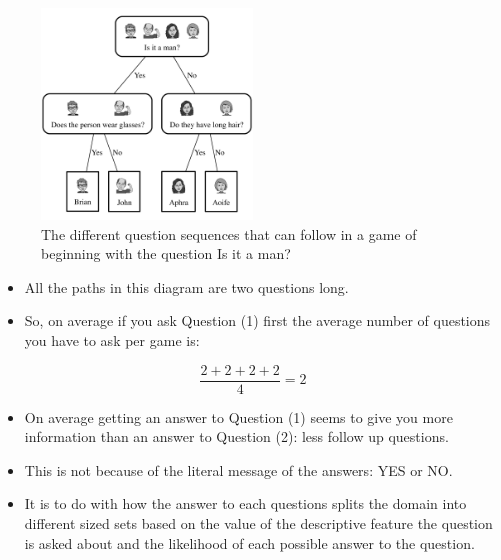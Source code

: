 \documentclass[xcolor={table}]{beamer}
\newcommand{\GW}{\text{\textit{Guess-Who~}}}
\begin{document}
 \begin{frame} 
\begin{figure}[htb]
		\centerline{
		\includegraphics[width=0.5\textwidth]{./images/dectreefacesUs1.pdf}
		}
	\caption{The different question sequences that can follow in a game of \GW beginning with the question \alert{Is it a man?}}
	\label{fig:dectreefaces1}
\end{figure}
\end{frame} 

 \begin{frame} 
\begin{itemize}
	\item All the paths in this diagram are two questions long. 
	\item So, on average if you ask Question (1) first the average number of questions you have to ask per game is:
\end{itemize}
\begin{equation*}
\frac{2+2+2+2}{4}=2 
\end{equation*}
\end{frame} 

\begin{frame}
	\begin{itemize}
		\item On average getting an answer to Question (1) seems to give you more information than an answer to Question (2): less follow up questions.
		\item This is not because of the literal message of the answers: YES or NO.
		\item It is to do with how the answer to each questions splits the domain into different sized sets based on the value of the descriptive feature the question is asked about and the likelihood of each possible answer to the question.
	\end{itemize}
\end{frame}
\end{document}
